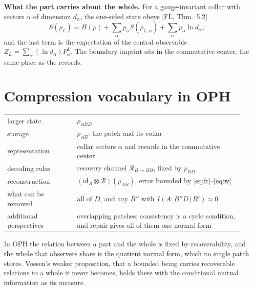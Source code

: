 \documentclass[11pt]{article}
\newcommand{\id}{\mathrm{id}}
\newcommand{\cit}[1]{[#1]}
\begin{document}
\textbf{What the part carries about the whole.} For a gauge-invariant collar with
sectors $\alpha$ of dimension $d_\alpha$, the one-sided state obeys \cit{FL, Thm.~5.2}
\[
S(\rho_L)=H(p)+\sum_\alpha p_\alpha S(\rho_{L,\alpha})+\sum_\alpha p_\alpha\ln d_\alpha ,
\]
and the last term is the expectation of the central observable
$Z_L=\sum_\alpha(\ln d_\alpha)P^L_\alpha$. The boundary imprint sits in the
commutative center, the same place as the records.

\section{Compression vocabulary in OPH}

\begin{tabular}{@{}p{0.29\linewidth}p{0.67\linewidth}@{}}
larger state & $\rho_{ABD}$\\
storage & $\rho_{AB}$: the patch and its collar\\
representation & collar sectors $\alpha$ and records in the commutative center\\
decoding rules & recovery channel $\mathcal R_{B\to BD}$, fixed by $\rho_{BD}$\\
reconstruction & $(\id_A\otimes\mathcal R)(\rho_{AB})$, error bounded by \eqref{eq:fr}--\eqref{eq:w}\\
what can be removed & all of $D$, and any $B''$ with $I(A{:}B''D\,|\,B')\approx0$\\
additional perspectives & overlapping patches; consistency is a cycle condition, and
repair gives all of them one normal form
\end{tabular}

In OPH the relation between a part and the whole is fixed by recoverability, and the
whole that observers share is the quotient normal form, which no single patch stores.
Vossen's weaker proposition, that a bounded being carries recoverable relations to a
whole it never becomes, holds there with the conditional mutual information as its
measure.
\end{document}
